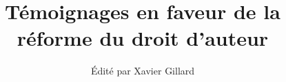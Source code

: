 \documentclass[11pt,liststotoc,bibtotoc]{scrbook}
\title{Témoignages en faveur de la réforme du droit d'auteur}
\author{Édité par Xavier Gillard}
\begin{document}
\renewcommand{\labelitemi}{$\bullet$}

\maketitle



\tableofcontents











\end{document}
